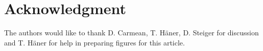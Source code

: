 \documentclass[journal]{IEEEtran}
\begin{document}
\section*{Acknowledgment}

The authors would like to thank D. Carmean, T. H\"aner, D. Steiger for discussion and T. H\"aner for help in preparing figures for this article.


\ifCLASSOPTIONcaptionsoff
  \newpage
\fi





%
%
%


% 









\end{document}
